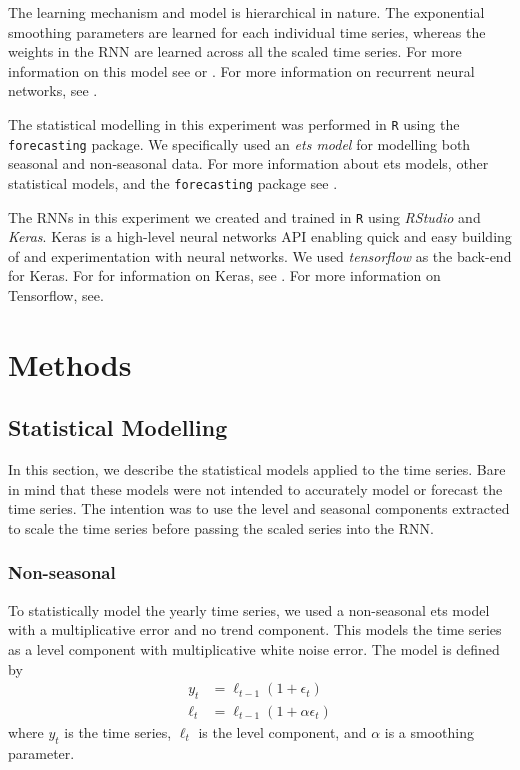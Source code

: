 \documentclass[a4paper,12pt]{article}
\theoremstyle{definition}
\begin{document}
The learning mechanism and model is hierarchical in nature. The exponential smoothing parameters are learned for each individual time series, whereas the weights in the RNN are learned across all the scaled time series. For more information on this model see \cite{smyl} or \cite{lit}. For more information on recurrent neural networks, see \cite{lit}.

The statistical modelling in this experiment was performed in \texttt{R} using the \texttt{forecasting} package. We specifically used an \textit{ets model} for modelling both seasonal and non-seasonal data. For more information about ets models, other statistical models, and the \texttt{forecasting} package see \cite{fpp}. 

The RNNs in this experiment we created and trained in \texttt{R} using \textit{RStudio} and \textit{Keras}. Keras is a high-level neural networks API enabling quick and easy building of and experimentation with neural networks. We used \textit{tensorflow} as the back-end for Keras. For for information on Keras, see \cite{keras}. For more information on Tensorflow, see\cite{tf}.

\section{Methods}

\subsection{Statistical Modelling}\label{sec:stats_modelling}
In this section, we describe the statistical models applied to the time series. Bare in mind that these models were not intended to accurately model or forecast the time series. The intention was to use the level and seasonal components extracted to scale the time series before passing the scaled series into the RNN.

\subsubsection{Non-seasonal}\label{sec:non_seasonal_stats_modelling}
To statistically model the yearly time series, we used a non-seasonal ets model with a multiplicative error and no trend component. This models the time series as a level component with multiplicative white noise error. The model is defined by
\begin{align}
	y_t &= \ell_{t-1}(1 + \epsilon_t) \label{eq:non_seasonal_series} \\
	\ell_t &= \ell_{t-1}(1 + \alpha \epsilon_t) \label{eq:non_seasonal_level}
\end{align}
where $y_t$ is the time series, $\ell_t$ is the level component, and $\alpha$ is a smoothing parameter.
\end{document}
